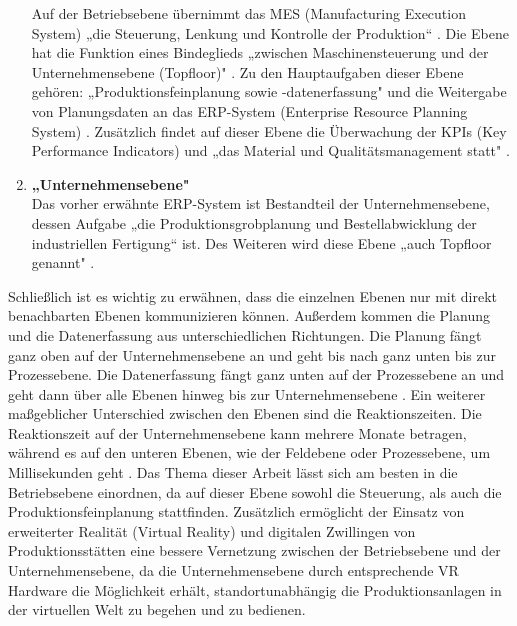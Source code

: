 \begin{enumerate}
	Auf der Betriebsebene übernimmt das MES (Manufacturing Execution System) „die Steuerung, Lenkung und Kontrolle der Produktion“ \cite[S.50]{14}. Die Ebene hat die Funktion eines Bindeglieds „zwischen Maschinensteuerung und der Unternehmensebene (Topfloor)" \cite[S.50]{14}. Zu den Hauptaufgaben dieser Ebene gehören: „Produktionsfeinplanung sowie -datenerfassung" \cite[S.50]{14} und die Weitergabe von Planungsdaten an das ERP-System (Enterprise Resource Planning System) \cite[S.50]{14}.  Zusätzlich findet auf dieser Ebene die Überwachung der KPIs (Key Performance Indicators) und „das Material und Qualitätsmanagement statt" \cite[S.405]{15}.
	\item \textbf{„Unternehmensebene"} \cite[S.50]{14} \\
	Das vorher erwähnte ERP-System ist Bestandteil der Unternehmensebene, dessen Aufgabe „die Produktionsgrobplanung und Bestellabwicklung der industriellen Fertigung“ \cite[S.50]{14} ist. Des Weiteren wird diese Ebene „auch Topfloor genannt" \cite[S.50]{14}.
\end{enumerate}
Schließlich ist es wichtig zu erwähnen, dass die einzelnen Ebenen nur mit direkt benachbarten Ebenen kommunizieren können. Außerdem kommen die Planung und die Datenerfassung aus unterschiedlichen Richtungen. Die Planung fängt ganz oben auf der Unternehmensebene an und geht bis nach ganz unten bis zur Prozessebene. Die Datenerfassung fängt ganz unten auf der Prozessebene an und geht dann über alle Ebenen hinweg bis zur Unternehmensebene \cite[S.50]{14}. Ein weiterer maßgeblicher Unterschied zwischen den Ebenen sind die Reaktionszeiten. Die Reaktionszeit auf der Unternehmensebene kann mehrere Monate betragen, während es auf den unteren Ebenen, wie der Feldebene oder Prozessebene, um Millisekunden geht \cite[S.123]{16}.
\newline
Das Thema dieser Arbeit lässt sich am besten in die Betriebsebene einordnen, da auf dieser Ebene sowohl die Steuerung, als auch die Produktionsfeinplanung stattfinden. Zusätzlich ermöglicht der Einsatz von erweiterter Realität (Virtual Reality) und digitalen Zwillingen von Produktionsstätten eine bessere Vernetzung zwischen der Betriebsebene und der Unternehmensebene, da die Unternehmensebene durch entsprechende VR Hardware die Möglichkeit erhält, standortunabhängig die Produktionsanlagen in der virtuellen Welt zu begehen und zu bedienen.

